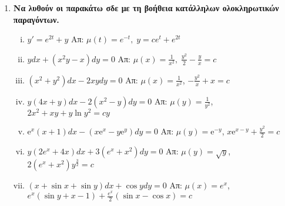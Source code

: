 \begin{enumerate}
    \pagebreak

  \item {\bfseries Να λυθούν οι παρακάτω σδε με τη βοήθεια κατάλληλων ολοκληρωτικών
    παραγόντων.}

    \begin{enumerate}[i)]

      \item $ y' = e^{2t}+y $ \hfill Απ: $ \mu (t) = e^{-t}, \; y=ce^{t}+e^{2t} $ 
      \item $ ydx+(x^{2}y-x)dy=0 $ \hfill Απ: $ \mu (x) = \frac{1}{x^{2}}, \;
        \frac{y^{2}}{2} - \frac{y}{x} = c $ 
      \item $ (x^{2}+y^{2})dx - 2xydy = 0 $ 
        \hfill Απ: $\mu(x)= \frac{1}{x^{2}}$, $ - \frac{y^{2}}{x} + x = c $
      \item $ y(4x+y)dx-2(x^{2}-y)dy=0 $ 
        \hfill Απ: $ \mu(y)= \frac{1}{y^{2}} $, $ 2x^{2}+xy+ y \ln{y^{2}} =cy$ 
      \item $ \mathrm{e}^{x}(x+1)dx-(x \mathrm{e}^{x}-y \mathrm{e}^{y})dy = 0 $
        \hfill Απ: $\mu(y)=\mathrm{e}^{-y} $, $x \mathrm{e}^{x-y} + \frac{y^{2}}{2}=c $
      \item $ y(2e^{x}+4x)dx + 3(e^{x}+x^{2})dy = 0 $ 
        \hfill Απ: $ \mu(y)= \sqrt{ y } $, $ 2(e^{x}+x^{2})y^{\frac{3}{2}}=c $ 
      \item $ (x + \sin{x} + \sin{y})dx + \cos{y} dy =0 $ 
        \hfill Απ: $\mu(x)=e^{x} $, $ e^x(\sin{y} + x-1) + \frac{e^{x}}{2} 
        (\sin{x} - \cos{x})=c $
    \end{enumerate}


\end{enumerate}
